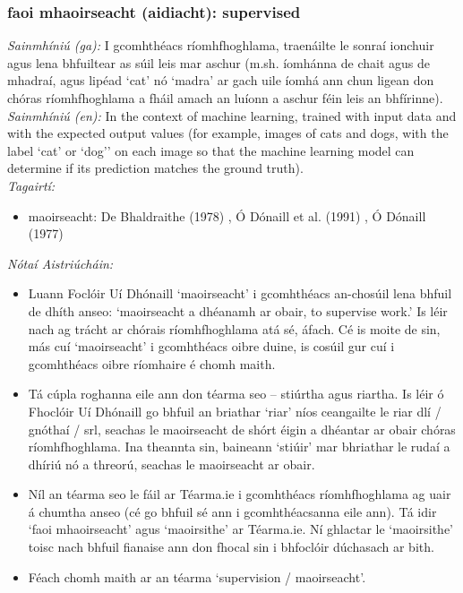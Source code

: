\documentclass{article}
\begin{document}
\subsubsection*{faoi mhaoirseacht (aidiacht): supervised}
 \noindent \textit{Sainmhíniú (ga):} I gcomhthéacs ríomhfhoghlama, traenáilte le sonraí ionchuir agus lena bhfuiltear as súil leis mar aschur (m.sh. íomhánna de chait agus de mhadraí, agus lipéad `cat' nó `madra' ar gach uile íomhá ann chun ligean don chóras ríomhfhoghlama a fháil amach an luíonn a aschur féin leis an bhfírinne).
\\
 \noindent \textit{Sainmhíniú (en):} In the context of machine learning, trained with input data and with the expected output values (for example, images of cats and dogs, with the label `cat' or `dog'' on each image so that the machine learning model can determine if its prediction matches the ground truth).
\\
 \noindent \textit{Tagairtí:}
\begin{itemize}
	\item maoirseacht: De Bhaldraithe (1978) \cite{de-bhaldraithe}, Ó Dónaill et al. (1991) \cite{focloir-beag}, Ó Dónaill (1977) \cite{odonaill}
\end{itemize}

 \noindent \textit{Nótaí Aistriúcháin:}
\begin{itemize}
	\item Luann Foclóir Uí Dhónaill `maoirseacht' i gcomhthéacs an-chosúil lena bhfuil de dhíth anseo: `maoirseacht a dhéanamh ar obair, to supervise work.' Is léir nach ag trácht ar chórais ríomhfhoghlama atá sé, áfach. Cé is moite de sin, más cuí `maoirseacht' i gcomhthéacs oibre duine, is cosúil gur cuí i gcomhthéacs oibre ríomhaire é chomh maith.
	\item Tá cúpla roghanna eile ann don téarma seo -- stiúrtha agus riartha. Is léir ó Fhoclóir Uí Dhónaill go bhfuil an briathar `riar' níos ceangailte le riar dlí / gnóthaí / srl, seachas le maoirseacht de shórt éigin a dhéantar ar obair chóras ríomhfhoghlama. Ina theannta sin, baineann `stiúir' mar bhriathar le rudaí a dhíriú nó a threorú, seachas le maoirseacht ar obair.
	\item Níl an téarma seo le fáil ar Téarma.ie i gcomhthéacs ríomhfhoghlama ag uair á chumtha anseo (cé go bhfuil sé ann i gcomhthéacsanna eile ann). Tá idir `faoi mhaoirseacht' agus `maoirsithe' ar Téarma.ie. Ní ghlactar le `maoirsithe' toisc nach bhfuil fianaise ann don fhocal sin i bhfoclóir dúchasach ar bith.
	\item Féach chomh maith ar an téarma `supervision / maoirseacht'.
\end{itemize}
\end{document}
